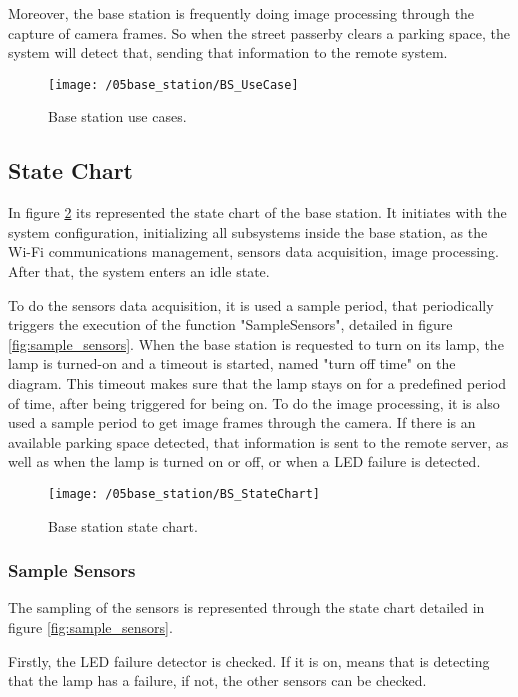 Moreover, the base station is frequently doing image processing through the capture of camera frames. So when the street passerby clears a parking space, the system will detect that, sending that information to the remote system.

\begin{figure}[ht] 
	\centering
	\texttt{[image: /05base\_station/BS\_UseCase]}
	\caption{Base station use cases.}
	\label{fig:bs_use_cases}
\end{figure}

\subsection{State Chart}
In figure \ref{fig:bs_state_chart} its represented the state chart of the base station. It initiates with the system configuration, initializing all subsystems inside the base station, as the Wi-Fi communications management, sensors data acquisition, image processing. After that, the system enters an idle state.

To do the sensors data acquisition, it is used a sample period, that periodically triggers the execution of the function "SampleSensors", detailed in figure \ref{fig:sample_sensors}. When the base station is requested to turn on its lamp, the lamp is turned-on and a timeout is started, named "turn off time" on the diagram. This timeout makes sure that the lamp stays on for a predefined period of time, after being triggered for being on. To do the image processing, it is also used a sample period to get image frames through the camera. If there is an available parking space detected, that information is sent to the remote server, as well as when the lamp is turned on or off, or when a LED failure is detected.

\begin{figure}[ht]
	\centering
	\texttt{[image: /05base\_station/BS\_StateChart]}
	\caption{Base station state chart.}
	\label{fig:bs_state_chart}
\end{figure}

\clearpage
\subsubsection{Sample Sensors}
The sampling of the sensors is represented through the state chart detailed in figure \ref{fig:sample_sensors}.

Firstly, the LED failure detector is checked. If it is on, means that is detecting that the lamp has a failure, if not, the other sensors can be checked.

